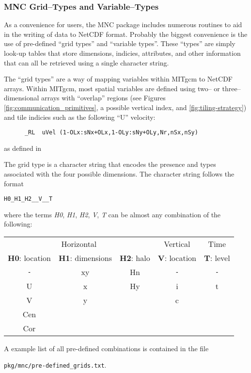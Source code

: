 \subsubsection{MNC Grid--Types and Variable--Types}

As a convenience for users, the MNC package includes numerous routines
to aid in the writing of data to NetCDF format.  Probably the biggest
convenience is the use of pre-defined ``grid types'' and ``variable
types''.  These ``types'' are simply look-up tables that store
dimensions, indicies, attributes, and other information that can all
be retrieved using a single character string.

The ``grid types'' are a way of mapping variables within MITgcm to
NetCDF arrays.  Within MITgcm, most spatial variables are defined
using two-- or three--dimensional arrays with ``overlap'' regions (see
Figures \ref{fig:communication_primitives}, a possible vertical index,
and \ref{fig:tiling-strategy}) and tile indicies such as the following
``U'' velocity:
\begin{verbatim}
      _RL  uVel (1-OLx:sNx+OLx,1-OLy:sNy+OLy,Nr,nSx,nSy)
\end{verbatim}
as defined in 

The grid type is a character string that encodes the presence and
types associated with the four possible dimensions.  The character
string follows the format
\begin{center}
  \texttt{H0\_H1\_H2\_\_V\_\_T}
\end{center}
where the terms \textit{H0}, \textit{H1}, \textit{H2}, \textit{V},
\textit{T} can be almost any combination of the following:
\begin{center}
  \begin{tabular}[h]{|ccc|c|c|}\hline
    \multicolumn{3}{|c|}{Horizontal} & Vertical & Time \\
    \textbf{H0}: location & \textbf{H1}: dimensions & \textbf{H2}: halo 
          & \textbf{V}: location & \textbf{T}: level  \\\hline
    \texttt{-} & xy & Hn & \texttt{-} & \texttt{-} \\
    U  &  x  &  Hy  &  i  &  t  \\
    V  &  y  &      &  c  &     \\
    Cen  &   &      &     &     \\
    Cor  &   &      &     &     \\\hline
  \end{tabular}
\end{center}
A example list of all pre-defined combinations is contained in the
file
\begin{center}
  \texttt{pkg/mnc/pre-defined\_grids.txt}.
\end{center}

